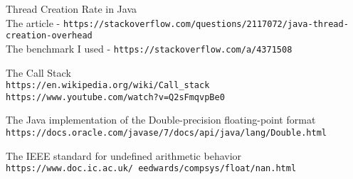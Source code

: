 \documentclass[../../main.tex]{subfiles}
\begin{document}
\begin{thebibliography}{9}
Thread Creation Rate in Java\\
The article - \texttt{https://stackoverflow.com/questions/2117072/java-thread-creation-overhead}\\
The benchmark I used - \texttt{https://stackoverflow.com/a/4371508}

The Call Stack\\
\texttt{https://en.wikipedia.org/wiki/Call\_stack}
\texttt{https://www.youtube.com/watch?v=Q2sFmqvpBe0}

The Java implementation of the Double-precision floating-point format\\
\texttt{https://docs.oracle.com/javase/7/docs/api/java/lang/Double.html}

The IEEE standard for undefined arithmetic behavior\\
\texttt{https://www.doc.ic.ac.uk/~eedwards/compsys/float/nan.html}

\end{thebibliography}
\end{document}
